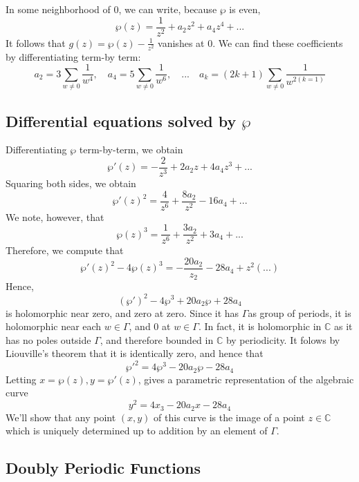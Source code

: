 \documentclass{article}
\newcommand{\mbb}[1]{\mathbb{#1}}
\begin{document}
In some neighborhood of 0, we can write, because \(\wp\) is even,
\[\wp(z) = \frac{1}{z^2} + a_2z^2 + a_4z^4 + ...\]
It follows that \(g(z) = \wp(z) - \frac{1}{z^2}\) vanishes at 0. We can find these coefficients by differentiating term-by term:
\[a_2 = 3\sum_{w \neq 0}\frac{1}{w^4}, \quad a_4 = 5\sum_{w \neq 0}\frac{1}{w^6}, \quad ... \quad a_k = (2k + 1)\sum_{w \neq 0}\frac{1}{w^{2(k = 1)}}\]

\subsection{Differential equations solved by \(\wp\)}

Differentiating \(\wp\) term-by-term, we obtain
\[\wp'(z) = -\frac{2}{z^3} + 2a_2z + 4a_4z^3 + ...\]
Squaring both sides, we obtain
\[\wp'(z)^2 = \frac{4}{z^6} + \frac{8a_2}{z^2} - 16a_4 + ...\]
We note, however, that
\[\wp(z)^3 = \frac{1}{z^6} + \frac{3a_2}{z^2} + 3a_4 + ...\]
Therefore, we compute that
\[\wp'(z)^2 - 4\wp(z)^3 = -\frac{20a_2}{z_2} - 28a_4 + z^2(...)\]
Hence,
\[(\wp')^2 - 4\wp^3 + 20a_2\wp + 28a_4\]
is holomorphic near zero, and zero at zero. Since it has \(\Gamma\)as group of periods, it is holomorphic near each \(w \in \Gamma\), and \(0\) at \(w \in \Gamma\). In fact, it is holomorphic in \(\mbb{C}\) as it has no poles outside \(\Gamma\), and therefore bounded in \(\mbb{C}\) by periodicity. It folows by Liouville's theorem that it is identically zero, and hence that
\[\wp'^2 = 4\wp^3 - 20a_2\wp - 28a_4\]
Letting \(x = \wp(z), y = \wp'(z)\), gives a parametric representation of the algebraic curve
\[y^2 = 4x_3 - 20a_2x - 28a_4\]
We'll show that any point \((x, y)\) of this curve is the image of a point \(z \in \mbb{C}\) which is uniquely determined up to addition by an element of \(\Gamma\).

\subsection{Doubly Periodic Functions}
\end{document}
